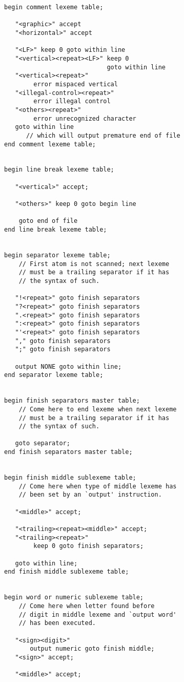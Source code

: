 \documentclass[12pt]{article}
\newenvironment{indpar}[1][0.3in]%
	{\begin{list}{}%
		     {\setlength{\itemsep}{0in}%
		      \setlength{\topsep}{0in}%
		      \setlength{\parsep}{1ex}%
		      \setlength{\labelwidth}{#1}%
		      \setlength{\leftmargin}{#1}%
		      \addtolength{\leftmargin}{\labelsep}}%
	 \item}%
	{\end{list}}
\begin{document}
\begin{indpar}
\begin{verbatim}
begin comment lexeme table;

   "<graphic>" accept
   "<horizontal>" accept

   "<LF>" keep 0 goto within line
   "<vertical><repeat><LF>" keep 0
                            goto within line
   "<vertical><repeat>"
        error mispaced vertical
   "<illegal-control><repeat>"
        error illegal control
   "<others><repeat>"
        error unrecognized character
   goto within line
      // which will output premature end of file
end comment lexeme table;


begin line break lexeme table;

   "<vertical>" accept;

   "<others>" keep 0 goto begin line

    goto end of file
end line break lexeme table;


begin separator lexeme table;
    // First atom is not scanned; next lexeme
    // must be a trailing separator if it has
    // the syntax of such.

   "!<repeat>" goto finish separators
   "?<repeat>" goto finish separators
   ".<repeat>" goto finish separators
   ":<repeat>" goto finish separators
   "'<repeat>" goto finish separators
   "," goto finish separators
   ";" goto finish separators

   output NONE goto within line;
end separator lexeme table;


begin finish separators master table;
    // Come here to end lexeme when next lexeme
    // must be a trailing separator if it has
    // the syntax of such.

   goto separator;
end finish separators master table;


begin finish middle sublexeme table;
    // Come here when type of middle lexeme has
    // been set by an `output' instruction.

   "<middle>" accept;

   "<trailing><repeat><middle>" accept;
   "<trailing><repeat>"
        keep 0 goto finish separators;

   goto within line;
end finish middle sublexeme table;


begin word or numeric sublexeme table;
    // Come here when letter found before
    // digit in middle lexeme and `output word'
    // has been executed.

   "<sign><digit>"
       output numeric goto finish middle;
   "<sign>" accept;

   "<middle>" accept;


\end{verbatim}
\end{indpar}
\end{document}
